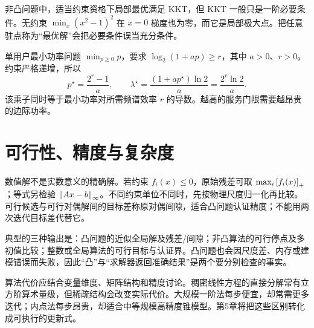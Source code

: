 非凸问题中，适当约束资格下局部最优满足 KKT，但 KKT 一般只是一阶必要条件。无约束 $\min_x(x^2-1)^2$ 在 $x=0$ 梯度也为零，而它是局部极大点。把任意驻点称为“最优解”会把必要条件误当充分条件。

\begin{example}[功率价格的解析值]
单用户最小功率问题 $\min_{p\ge0}p$，要求 $\log_2(1+ap)\ge r$，其中 $a>0$、$r>0$。约束严格递增，所以
\begin{equation}
 p^\star=\frac{2^r-1}{a},\qquad
 \lambda^\star=\frac{(1+ap^\star)\ln2}{a}=\frac{2^r\ln2}{a}.
\end{equation}
该乘子同时等于最小功率对所需频谱效率 $r$ 的导数。越高的服务门限需要越昂贵的边际功率。
\end{example}

\section{可行性、精度与复杂度}
数值解不是实数意义的精确解。若约束 $f_i(x)\le0$，原始残差可取 $\max_i\left[f_i(x)\right]_+$；等式另检验 $\left\lVert Ax-b\right\rVert_\infty$。不同约束单位不同时，先按物理尺度归一化再比较。可行候选与可行对偶解间的目标差称原对偶间隙，适合凸问题认证精度；不能用两次迭代目标差代替它。

典型的三种输出是：凸问题的近似全局解及残差/间隙；非凸算法的可行停点及多初值比较；整数或全局算法的可行目标与认证界。凸问题也会因尺度差、内存或建模错误而失败，因此“凸”与“求解器返回准确结果”是两个要分别检查的事实。

算法代价应结合变量维度、矩阵结构和精度讨论。稠密线性方程的直接分解常有立方阶算术量级，但稀疏结构会改变实际代价。大规模一阶法每步便宜，却常需更多迭代；内点法每步昂贵，却适合中等规模高精度锥模型。第5章将把这些区别转化成可执行的更新式。
